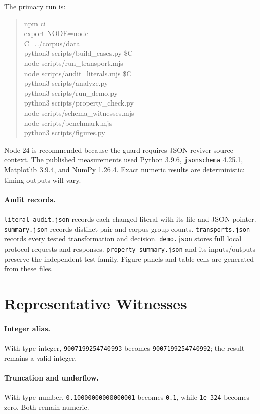 \documentclass[11pt]{article}
\begin{document}
The primary run is:
\begin{quote}\scriptsize\ttfamily
npm ci\\
export NODE=node\\
C=../corpus/data\\
python3 scripts/build\_cases.py \$C\\
node scripts/run\_transport.mjs\\
node scripts/audit\_literals.mjs \$C\\
python3 scripts/analyze.py\\
python3 scripts/run\_demo.py\\
python3 scripts/property\_check.py\\
node scripts/schema\_witnesses.mjs\\
node scripts/benchmark.mjs\\
python3 scripts/figures.py
\end{quote}
Node 24 is recommended because the guard requires JSON reviver source context. The published measurements used Python 3.9.6, \texttt{jsonschema} 4.25.1, Matplotlib 3.9.4, and NumPy 1.26.4. Exact numeric results are deterministic; timing outputs will vary.

\paragraph{Audit records.}
\texttt{literal\_audit.json} records each changed literal with its file and JSON pointer. \texttt{summary.json} records distinct-pair and corpus-group counts. \texttt{transports.json} records every tested transformation and decision. \texttt{demo.json} stores full local protocol requests and responses. \texttt{property\_summary.json} and its inputs/outputs preserve the independent test family. Figure panels and table cells are generated from these files.

\section{Representative Witnesses}
\paragraph{Integer alias.}
With type integer, \texttt{9007199254740993} becomes \texttt{9007199254740992}; the result remains a valid integer.
\paragraph{Truncation and underflow.}
With type number, \texttt{0.10000000000000001} becomes \texttt{0.1}, while \texttt{1e-324} becomes zero. Both remain numeric.
\end{document}
